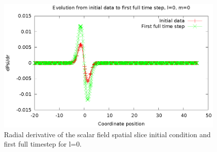 \begin{figure}
  \includegraphics{phi1dl0}
  \caption{Radial derivative of the scalar field spatial slice initial condition and first full timestep for l=0.}
\end{figure}
